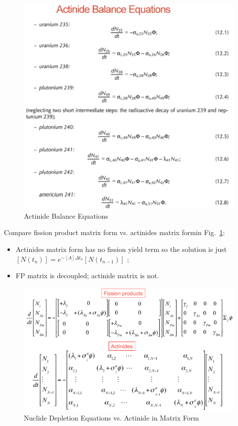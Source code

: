 \documentclass{school-22.211-notes}
\begin{document}
\begin{figure}[ht]
  \centering
  \includegraphics[width=5in]{images/dfs/actinide-balance.png}
  \caption{Actinide Balance Equations}
\end{figure}

\clearpage
{}
Compare fission product matrix form vs. actinides matrix formin Fig.~\ref{fp-an-matrix-form}: 
\begin{itemize}
\item Actinides matrix form has no fission yield term so the solution is just $[N(t_n)] = e^{-[A] \Delta t_n} [N(t_{n-1})]$ ;
\item FP matrix is decoupled; actinide matrix is not. 
\end{itemize}
\begin{figure}[ht]
  \centering
  \includegraphics[width=5in]{images/dfs/fp-an-matrix-form.png}
  \caption{Nuclide Depletion Equations vs. Actinide in Matrix Form} \label{fp-an-matrix-form}
\end{figure}
\end{document}

